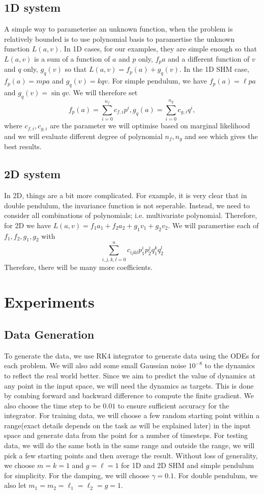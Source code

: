 \documentclass{statsmsc}
\begin{document}
\section{1D system}
A simple way to parameterise an unknown function, when the problem is relatively bounded is to use polynomial basis to paramertise the unknown function $L(a,v)$.
In 1D cases, for our examples, they are simple enough so that $L(a,v)$ is a sum of a function of $a$ and $p$ only, $f_pa$ and a different function of $v$ and $q$ only, $g_q(v)$ so that $L(a,v)=f_p(a)+g_q(v)$.
In the 1D SHM case, $f_p(a)=mpa$ and $g_q(v)=kqv$.
For simple pendulum, we have $f_p(a)=\ell pa$ and $g_q(v)=\sin qv$.
We will therefore set $$f_p(a)=\sum_{i=0}^{n_f}c_{f,i}p^i,g_q(a)=\sum_{i=0}^{n_g}c_{g,i}q^i,$$
where $c_{f,i}, c_{g,i}$ are the parameter we will optimise based on marginal likelihood and we will evaluate different degree of polynomial $n_f, n_g$ and see which gives the best results. 

\section{2D system}
In 2D, things are a bit more complicated. For example, it is very clear that in double pendulum, the invariance function is not seperable.
Instead, we need to consider all combinations of polynomials; i.e. multivariate polynomial.
Therefore, for 2D we have $L(a,v)=f_1a_1+f_2a_2+g_1v_1+g_2v_2.$
We will paramertise each of $f_1, f_2, g_1, g_2$ with $$\sum_{i,j,k,l=0}^{n}c_{ijkl}p_1^ip_2^jq_1^kq_2^l$$
Therefore, there will be many more coefficients.

\chapter{Experiments}
\section{Data Generation}
To generate the data, we use RK4 integrator to generate data using the ODEs for each problem. 
We will also add some small Gaussian noise $10^{-8}$ to the dynamics to reflect the real world better.
Since we aim to predict the value of dynamics at any point in the input space, we will need the dynamics as targets. 
This is done by combing forward and backward difference to compute the finite gradient. 
We also choose the time step to be $0.01$ to ensure sufficient accuracy for the integrator.
For training data, we will choose a few random starting point within a range(exact details depends on the task as will be explained later) in the input space and generate data from the point for a number of timesteps. 
For testing data, we will do the same both in the same range and outside the range, we will pick a few starting points and then average the result.
Without loss of generality, we choose $m=k=1$ and $g=\ell=1$ for 1D and 2D SHM and simple pendulum for simplicity. For the damping, we will choose $\gamma= 0.1$. 
For double pendulum, we also let $m_1=m_2=\ell_1=\ell_2=g=1.$
\end{document}
